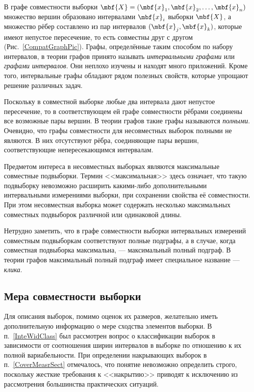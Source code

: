 \documentclass[a5paper,openany]{book}
\begin{document}
В графе совместности выборки $\mbf{X} = (\mbf{x}_{1}, \mbf{x}_{2}, \ldots, \mbf{x}_{n} )$ 
множество вершин образовано интервалами $\mbf{x}_{i}$ выборки $\mbf{X}$, а множество 
рёбер составлено из пар интервалов $(\mbf{x}_{j},\mbf{x}_{k})$, которые имеют непустое 
пересечение, то есть совместны друг с другом (Рис.~\ref{CompatGraphPic}). Графы, 
определённые таким способом по набору интервалов, в теории графов принято называть 
\emph{интервальными графами} или \emph{графами интервалов}. Они неплохо изучены и находят 
много приложений. Кроме того, интервальные графы обладают 
рядом полезных свойств, которые упрощают решение различных задач. 

Поскольку в совместной выборке любые два интервала дают непустое пересечение, то 
в соответствующем ей графе совместности рёбрами соединены все возможные пары вершин. 
В теории графов такие графы называются \emph{полными}. Очевидно, что 
графы совместности для несовместных выборок полными не являются. В них отсутствуют рёбра, 
соединяющие пары вершин, соответствующие непересекающимся интервалам.

Предметом интереса в несовместных выборках являются максимальные совместные подвыборки. 
Термин <<максимальная>> здесь означает, что такую подвыборку невозможно расширить 
какими-либо дополнительными интервальными измерениями выборки, при сохранении свойства 
её совместности. При этом несовместная выборка может содержать несколько максимальных 
совместных подвыборок различной или одинаковой длины. 

Нетрудно заметить, что в графе совместности выборки интервальных измерений совместным 
подвыборкам соответствуют полные подграфы, а в случае, когда совместная подвыборка 
максимальна, --- максимальный полный подграф. В теории графов максимальный полный 
подграф имеет специальное название --- \emph{клика}. 

\subsection{Мера совместности выборки}
\label{CompatibilityMeasure} 

Для описания выборок, помимо оценок их размеров, желательно иметь дополнительную информацию о мере сходства элементов выборки. В п.~\ref{InteWidClass} был рассмотрен вопрос о классификации выборок в зависимости от соотношения ширин интервалов в выборке по отношению к их полной вариабельности.
При определении накрывающих выборок в п.~\ref{CoverMeasrSect} отмечалось, что понятие невозможно определить строго, поскольку жесткие требования к <<накрытию>> приводят к исключению из рассмотрения большинства практических ситуаций.
\end{document}
